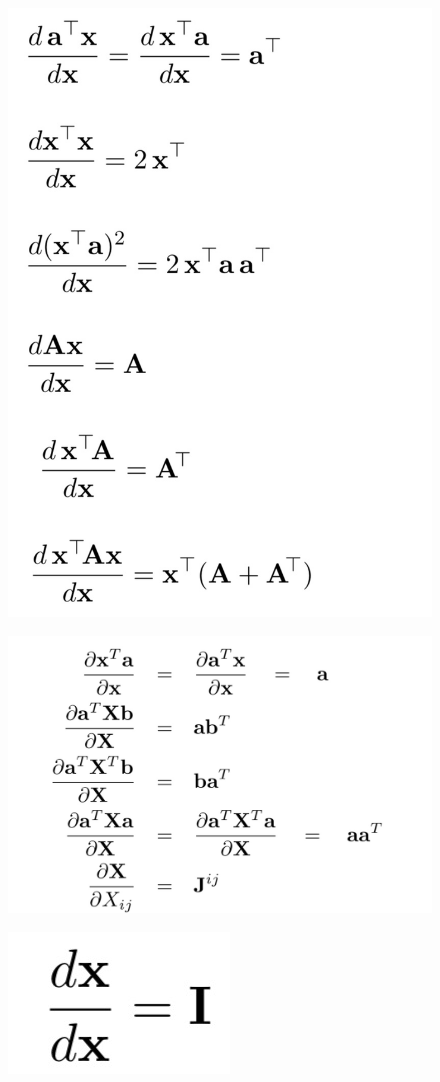 \documentclass[14pt]{extreport}
\begin{document}
\begin{figure}[H]
\centering
\includegraphics[width=0.4\linewidth]{71.jpeg}
\end{figure}
\begin{figure}[H]
\centering
\includegraphics[width=0.7\linewidth]{73.jpeg}
\end{figure}
\begin{figure}[H]
\centering
\includegraphics[width=0.2\linewidth]{72.jpeg}
\end{figure}
\end{document}
